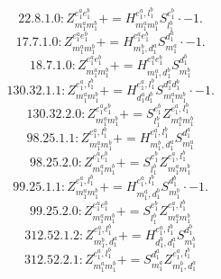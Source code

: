 \documentclass[letterpaper,10pt,fleqn,leqno,onecolumn]{article}
\begin{document}
\begin{equation} \;\;\;\;\;\;  22.8.1.0: Z^{e_{1}^{a}e_{1}^{b}}_{m_{1}^{a}m_{1}^{b}}+=H^{e_{1}^{a},l_{1}^{b}}_{m_{1}^{a}m_{1}^{b}}S^{e_{1}^{b}}_{l_{1}^{b}}\cdot -1. \end{equation}
\begin{equation} \;\;\;\;\;\;  17.7.1.0: Z^{e_{1}^{a}e_{1}^{b}}_{m_{1}^{a}m_{1}^{b}}+=H^{e_{1}^{a}e_{1}^{b}}_{m_{1}^{b},d_{1}^{a}}S^{d_{1}^{a}}_{m_{1}^{a}}\cdot -1. \end{equation}
\begin{equation} \;\;\;\;\;\;  18.7.1.0: Z^{e_{1}^{a}e_{1}^{b}}_{m_{1}^{a}m_{1}^{b}}+=H^{e_{1}^{a}e_{1}^{b}}_{m_{1}^{a},d_{1}^{b}}S^{d_{1}^{b}}_{m_{1}^{b}} \end{equation}
\begin{equation} \;\;\;\;\;\;  130.32.1.1: Z^{e_{1}^{a},l_{1}^{b}}_{m_{1}^{a}m_{1}^{b}}+=H^{e_{1}^{a},l_{1}^{b}}_{d_{1}^{a}d_{1}^{b}}S^{d_{1}^{a}d_{1}^{b}}_{m_{1}^{a}m_{1}^{b}}\cdot -1. \end{equation}
\begin{equation} \;\;\;\;\;\;  130.32.2.0: Z^{e_{1}^{a}e_{1}^{b}}_{m_{1}^{a}m_{1}^{b}}+=S^{e_{1}^{b}}_{l_{1}^{b}}Z^{e_{1}^{a},l_{1}^{b}}_{m_{1}^{a}m_{1}^{b}} \end{equation}
\begin{equation} \;\;\;\;\;\;  98.25.1.1: Z^{e_{1}^{a},l_{1}^{b}}_{m_{1}^{a}m_{1}^{b}}+=H^{e_{1}^{a},l_{1}^{b}}_{m_{1}^{b},d_{1}^{a}}S^{d_{1}^{a}}_{m_{1}^{a}} \end{equation}
\begin{equation} \;\;\;\;\;\;  98.25.2.0: Z^{e_{1}^{a}e_{1}^{b}}_{m_{1}^{a}m_{1}^{b}}+=S^{e_{1}^{b}}_{l_{1}^{b}}Z^{e_{1}^{a},l_{1}^{b}}_{m_{1}^{a}m_{1}^{b}} \end{equation}
\begin{equation} \;\;\;\;\;\;  99.25.1.1: Z^{e_{1}^{a},l_{1}^{b}}_{m_{1}^{a}m_{1}^{b}}+=H^{e_{1}^{a},l_{1}^{b}}_{m_{1}^{a},d_{1}^{b}}S^{d_{1}^{b}}_{m_{1}^{b}}\cdot -1. \end{equation}
\begin{equation} \;\;\;\;\;\;  99.25.2.0: Z^{e_{1}^{a}e_{1}^{b}}_{m_{1}^{a}m_{1}^{b}}+=S^{e_{1}^{b}}_{l_{1}^{b}}Z^{e_{1}^{a},l_{1}^{b}}_{m_{1}^{a}m_{1}^{b}} \end{equation}
\begin{equation} \;\;\;\;\;\;  312.52.1.2: Z^{e_{1}^{a},l_{1}^{b}}_{m_{1}^{b},d_{1}^{a}}+=H^{e_{1}^{a},l_{1}^{b}}_{d_{1}^{b},d_{1}^{a}}S^{d_{1}^{b}}_{m_{1}^{b}} \end{equation}
\begin{equation} \;\;\;\;\;\;  312.52.2.1: Z^{e_{1}^{a},l_{1}^{b}}_{m_{1}^{a}m_{1}^{b}}+=S^{d_{1}^{a}}_{m_{1}^{a}}Z^{e_{1}^{a},l_{1}^{b}}_{m_{1}^{b},d_{1}^{a}} \end{equation}
\end{document}
